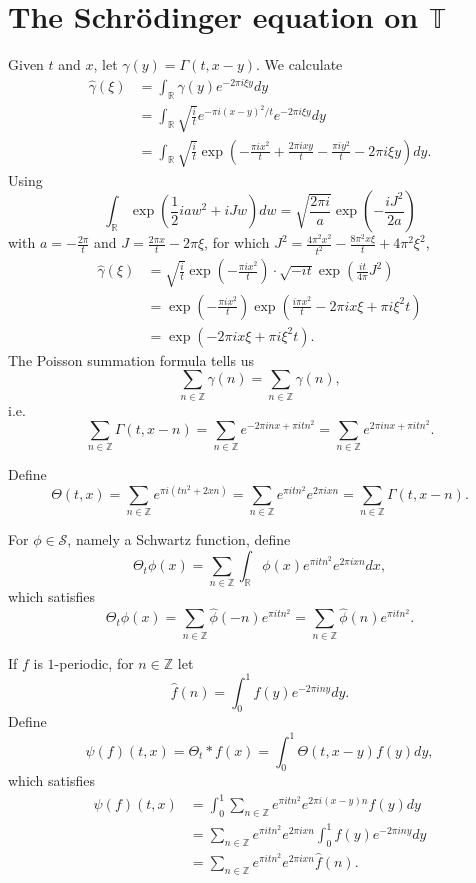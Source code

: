 \documentclass{article}
\theoremstyle{definition}
\begin{document}
\section{The Schr\"odinger equation on $\mathbb{T}$}
Given $t$ and $x$, let $\gamma(y) = \Gamma(t,x-y)$. We calculate
\begin{align*}
\widehat{\gamma}(\xi)&=\int_{\mathbb{R}} \gamma(y) e^{-2\pi i\xi y} dy\\
&=\int_{\mathbb{R}} \sqrt{\frac{i}{t}}  e^{-\pi i(x-y)^2/t}e^{-2\pi i\xi y} dy\\
&=\int_{\mathbb{R}} \sqrt{\frac{i}{t}}  \exp\left( -\frac{\pi ix^2}{t} + \frac{2\pi ixy}{t} - \frac{\pi iy^2}{t} - 2\pi i\xi y\right) dy.
\end{align*}
Using
\[
\int_{\mathbb{R}} \exp\left(\frac{1}{2}iaw^2 + iJw\right) dw = \sqrt{ \frac{2\pi i}{a}} \exp\left(-\frac{iJ^2}{2a}\right)
\]
with $a=-\frac{2\pi}{t}$ and $J=\frac{2\pi x}{t}-2\pi \xi$, for which $J^2 = \frac{4\pi^2 x^2}{t^2} - \frac{8\pi^2 x\xi}{t} + 4\pi^2 \xi^2$,
\begin{align*}
\widehat{\gamma}(\xi)&=\sqrt{\frac{i}{t}} \exp\left(-\frac{\pi ix^2}{t} \right) \cdot \sqrt{-it} \exp\left( \frac{it}{4\pi} J^2 \right)\\
&=  \exp\left(-\frac{\pi ix^2}{t} \right)  \exp\left( \frac{i\pi x^2}{t} - 2\pi i x\xi + \pi i \xi^2 t \right)\\
&=\exp\left(-2\pi ix\xi + \pi i\xi^2 t \right).
\end{align*}
The Poisson summation formula tells us
\[
\sum_{n \in \mathbb{Z}} \gamma(n) = \sum_{n \in \mathbb{Z}} \widehat{\gamma}(n),
\]
i.e.
\[
\sum_{n \in \mathbb{Z}}  \Gamma(t,x-n) = \sum_{n \in \mathbb{Z}} e^{-2\pi inx + \pi itn^2} = \sum_{n \in \mathbb{Z}} e^{2\pi inx
+\pi itn^2}.
\]


Define
\[
\Theta(t,x) =  \sum_{n \in \mathbb{Z}} e^{\pi i(tn^2+2xn)} = \sum_{n \in \mathbb{Z}} e^{\pi itn^2} e^{2\pi ixn}
=\sum_{n \in \mathbb{Z}}  \Gamma(t,x-n).
\]

For $\phi \in \mathscr{S}$, namely a Schwartz function,
define
\[
\Theta_t \phi(x) = \sum_{n \in \mathbb{Z}} \int_{\mathbb{R}} \phi(x)  e^{\pi itn^2} e^{2\pi ixn} dx,
\]
which satisfies
\[
\Theta_t \phi(x) = \sum_{n \in \mathbb{Z}} \widehat{\phi}(-n) e^{\pi itn^2} = \sum_{n \in \mathbb{Z}} \widehat{\phi}(n) e^{\pi itn^2}.
\]

If $f$ is $1$-periodic, for $n \in \mathbb{Z}$ let
\[
\widehat{f}(n) = \int_0^1 f(y) e^{-2\pi iny} dy.
\]
Define
\[
\psi(f)(t,x)=\Theta_t * f(x) = \int_0^1 \Theta(t,x-y) f(y) dy,
\]
which satisfies
\begin{align*}
\psi(f)(t,x)&=\int_0^1  \sum_{n \in \mathbb{Z}} e^{\pi itn^2} e^{2\pi i(x-y)n} f(y) dy\\
&=\sum_{n \in \mathbb{Z}} e^{\pi itn^2} e^{2\pi ixn} \int_0^1 f(y) e^{-2\pi iny} dy\\
&=\sum_{n \in \mathbb{Z}} e^{\pi itn^2} e^{2\pi ixn} \widehat{f}(n).
\end{align*}
\end{document}
